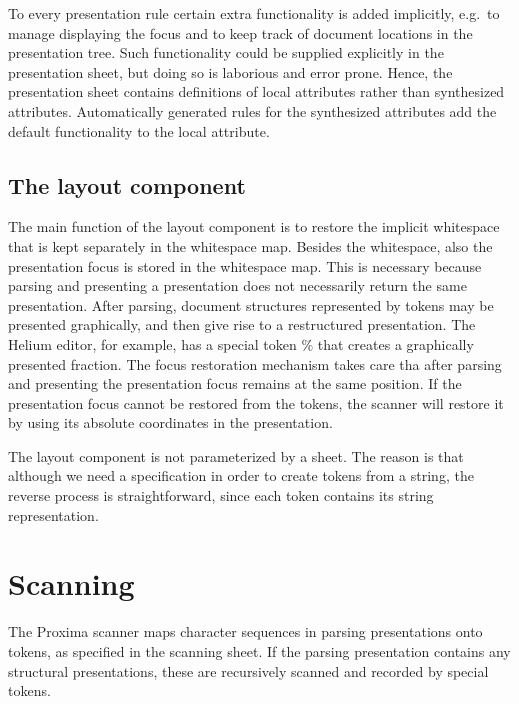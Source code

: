 \documentclass[12pt]{article}
\begin{document}
To every presentation rule certain extra functionality is added implicitly, e.g.\ to manage displaying the focus and to keep track of document locations in the presentation tree. Such functionality could be supplied explicitly in the presentation sheet, but doing so is laborious and error prone. Hence, the presentation sheet contains definitions of local attributes  rather than synthesized attributes. Automatically generated rules for the synthesized  attributes add the default functionality to the local attribute.


\subsection{The layout component}

The main function of the layout component is to restore the implicit whitespace that is kept separately in the whitespace map. Besides the whitespace, also the presentation focus is stored in the whitespace map. This is necessary because parsing and presenting a presentation does not necessarily return the same presentation. After parsing, document structures represented by tokens may be presented graphically, and then give rise to a restructured presentation. The Helium editor, for example, has a special token $\%$ that creates a graphically presented fraction. The focus restoration mechanism takes care tha after parsing and presenting the presentation focus remains at the same position. If the presentation focus cannot be restored from the tokens, the scanner will restore it by using its absolute coordinates in the presentation. 

The layout component is not parameterized by a sheet. The reason is that although we need a specification in order to create tokens from a string, the reverse process is straightforward, since each token contains its string representation.  





%
\section{Scanning}\label{sect:scanner}
%

The Proxima scanner maps character sequences in parsing presentations onto tokens, as specified in the scanning sheet. If the parsing presentation contains any structural presentations, these are recursively scanned and recorded by special tokens.
\end{document}
